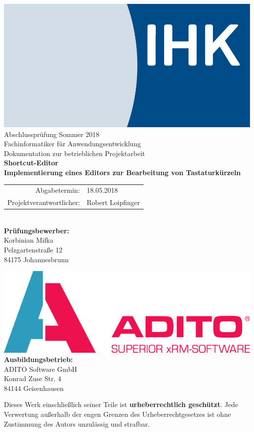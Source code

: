 \begin{titlepage}

\begin{center}
\includegraphics[scale=0.25]{../graphic/images/logo/LogoIHK}\\[1ex]
\Large{Abschlussprüfung Sommer 2018}\\[3ex]

\Large{Fachinformatiker für Anwendungsentwicklung}\\
\LARGE{Dokumentation zur betrieblichen Projektarbeit}\\[4ex]

\huge{\textbf{Shortcut-Editor}}\\[1.5ex]
\Large{\textbf{Implementierung eines Editors zur Bearbeitung von Tastaturkürzeln}}\\[4ex]

\normalsize
\begin{tabularx}{0.54\textwidth}{rl}
Abgabetermin: & 18.05.2018 \\
Projektverantwortlicher: & Robert Loipfinger\\
\end{tabularx}
\\[3em]

\textbf{Prüfungsbewerber:}\\
Korbinian Mifka\\
Pelzgartenstraße 12\\
84175 Johannesbrunn\\

\vfill

\includegraphics[scale=0.7]{../graphic/images/logo/ADITO_Logo}\\[2ex]
\textbf{Ausbildungsbetrieb:}\\
ADITO Software GmbH\\
Konrad Zuse Str. 4\\
84144 Geisenhausen\\[5em]
\end{center}

\vfill
\small
\noindent
Dieses Werk einschließlich seiner Teile ist \textbf{urheberrechtlich geschützt}.
Jede Verwertung außerhalb der engen Grenzen des Urheberrechtgesetzes ist ohne
Zustimmung des Autors unzulässig und strafbar.

\end{titlepage}